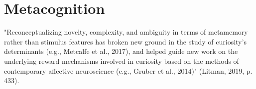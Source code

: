 \chapter{Metacognition}\label{ch:metacognition}


"Reconceptualizing novelty, complexity, and ambiguity in terms of metamemory rather than stimulus features has broken new ground in the study of curiosity’s determinants (e.g., Metcalfe et al., 2017), and helped guide new work on the underlying reward mechanisms involved in curiosity based on the methods of contemporary affective neuroscience (e.g., Gruber et al., 2014)" (Litman, 2019, p. 433).

